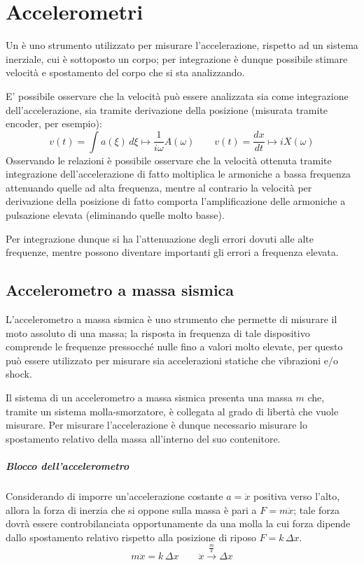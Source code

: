 \chapter{Accelerometri}
	Un  è uno strumento utilizzato per misurare l'accelerazione, rispetto ad un sistema inerziale, cui è sottoposto un corpo; per integrazione è dunque possibile stimare velocità e spostamento del corpo che si sta analizzando.
	
	E' possibile osservare che la velocità può essere analizzata sia come integrazione dell'accelerazione, sia tramite derivazione della posizione (misurata tramite encoder, per esempio):
	\[ v(t) = \int a(\xi)\, d\xi \mapsto \frac 1{i\omega} A(\omega) \qquad v(t) = \frac{dx}{dt}\mapsto i X (\omega) \]
	Osservando le relazioni è possibile osservare che la velocità ottenuta tramite integrazione dell'accelerazione di fatto moltiplica le armoniche a bassa frequenza attenuando quelle ad alta frequenza, mentre al contrario la velocità per derivazione della posizione di fatto comporta l'amplificazione delle armoniche a pulsazione elevata (eliminando quelle molto basse).
	
	Per integrazione dunque si ha l'attenuazione degli errori dovuti alle alte frequenze, mentre possono diventare importanti gli errori a frequenza elevata.
	
	
	
	
	
\section{Accelerometro a massa sismica}
	L'accelerometro a massa sismica è uno strumento che permette di misurare il moto assoluto di una massa; la risposta in frequenza di tale dispositivo comprende le frequenze pressocché nulle fino a valori molto elevate, per questo può essere utilizzato per misurare sia accelerazioni statiche che vibrazioni e/o shock.
	
	Il sistema di un accelerometro a massa sismica presenta una massa $m$ che, tramite un sistema molla-smorzatore, è collegata al grado di libertà che vuole misurare. Per misurare l'accelerazione è dunque necessario misurare lo spostamento relativo della massa all'interno del suo contenitore.
	
	\paragraph{Blocco dell'accelerometro} Considerando di imporre un'accelerazione costante $a = \ddot x$ positiva verso l'alto, allora la forza di inerzia che si oppone sulla massa è pari a $F=m\ddot x$; tale forza dovrà essere controbilanciata opportunamente da una molla la cui forza dipende dallo spostamento relativo rispetto alla posizione di riposo $F= k \, \Delta x$.
	\[ m\ddot x = k \, \Delta x \qquad \ddot x \xrightarrow{\frac m k} \Delta x\]
	
